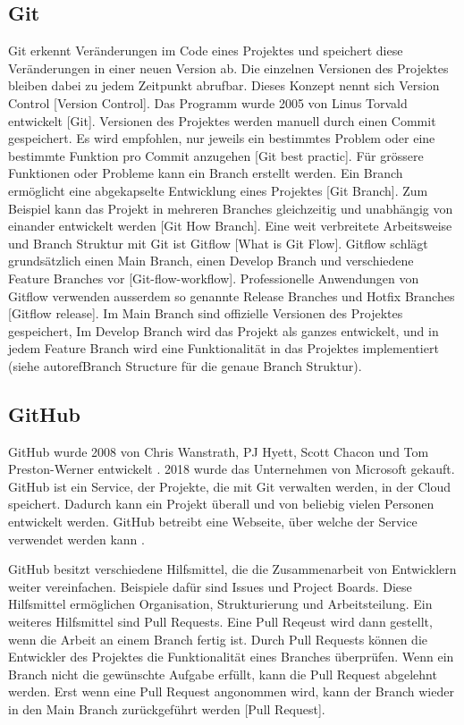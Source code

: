 \subsection{Git}\label{sub:t_git_git} Git erkennt Veränderungen im Code eines
Projektes und speichert diese Veränderungen in einer neuen Version ab. Die
einzelnen Versionen des Projektes bleiben dabei zu jedem Zeitpunkt abrufbar.
Dieses Konzept nennt sich Version Control [Version Control]. Das Programm wurde
2005 von Linus Torvald entwickelt [Git]. Versionen des Projektes werden manuell
durch einen Commit gespeichert. Es wird empfohlen, nur jeweils ein bestimmtes
Problem oder eine bestimmte Funktion pro Commit anzugehen [Git best practic].
Für grössere Funktionen oder Probleme kann ein Branch erstellt werden. Ein
Branch ermöglicht eine abgekapselte Entwicklung eines Projektes [Git Branch].
Zum Beispiel kann das Projekt in mehreren Branches gleichzeitig und unabhängig
von einander entwickelt werden [Git How Branch]. Eine weit verbreitete
Arbeitsweise und Branch Struktur mit Git ist Gitflow [What is Git Flow]. Gitflow
schlägt grundsätzlich einen Main Branch, einen Develop Branch und verschiedene
Feature Branches vor [Git-flow-workflow]. Professionelle Anwendungen von Gitflow
verwenden ausserdem so genannte Release Branches und Hotfix Branches [Gitflow
release].  Im Main Branch sind offizielle Versionen des Projektes gespeichert,
Im Develop Branch wird das Projekt als ganzes entwickelt, und in jedem Feature
Branch wird eine Funktionalität in das Projektes implementiert (siehe
autoref{Branch Structure} für die genaue Branch Struktur). 




\subsection{GitHub}\label{sub:t_git_gh}
GitHub wurde 2008 von Chris Wanstrath, PJ Hyett, Scott Chacon und Tom
Preston-Werner entwickelt \cite{noauthor_github_2021}. 2018 wurde das
Unternehmen von Microsoft gekauft. GitHub ist ein Service, der Projekte, die mit
Git verwalten werden, in der Cloud speichert. Dadurch kann ein Projekt überall
und von beliebig vielen Personen entwickelt werden. GitHub betreibt eine
Webseite, über welche der Service verwendet werden kann
\cite{noauthor_github_2021}.

GitHub besitzt verschiedene Hilfsmittel, die die Zusammenarbeit von Entwicklern
weiter vereinfachen. Beispiele dafür sind Issues und Project Boards. Diese
Hilfsmittel ermöglichen Organisation, Strukturierung und Arbeitsteilung. Ein
weiteres Hilfsmittel sind Pull Requests. Eine Pull Reqeust wird dann gestellt,
wenn die Arbeit an einem Branch fertig ist. Durch Pull Requests können die
Entwickler des Projektes die Funktionalität eines Branches überprüfen. Wenn ein
Branch nicht die gewünschte Aufgabe erfüllt, kann die Pull Request abgelehnt
werden. Erst wenn eine Pull Request angonommen wird, kann der Branch wieder in
den Main Branch zurückgeführt werden [Pull Request].

